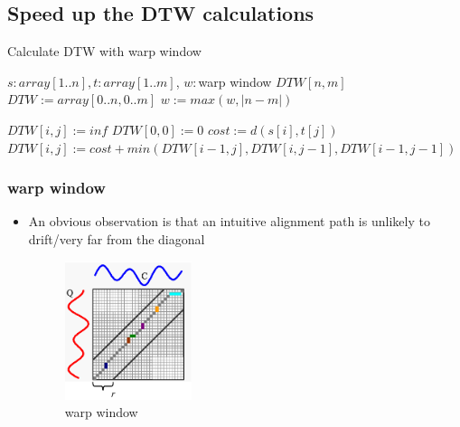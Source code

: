 \documentclass[xetex,mathserif,serif]{beamer}
\begin{document}
\subsection{Speed up the DTW calculations}

\begin{algorithm}
\caption{Calculate DTW with warp window}
\begin{algorithmic}[1]
\small
\REQUIRE $s:array[1..n], t:array[1..m]$, $w:$warp window
\ENSURE $DTW[n,m]$
\STATE $DTW := array[0..n,0..m]$
\STATE $w := max(w,\left| {n-m} \right|)$

\STATE $DTW[i,j] := inf$
\ENDFOR
\ENDFOR
\STATE $DTW[0,0] := 0$
\STATE
{}
\STATE $cost := d(s[i],t[j])$
\STATE $DTW[i,j]:=cost+min(DTW[i-1,j],DTW[i,j-1],DTW[i-1,j-1])$
\ENDFOR
\ENDFOR
\end{algorithmic}
\end{algorithm}

\begin{frame}
\frametitle{warp window}
\begin{itemize}
  \item An obvious observation is that an intuitive alignment path is unlikely to drift/very far from the diagonal
      \vspace{1em}
    \begin{figure}
      \centering
      \includegraphics[width=0.35\textwidth]{warp_window.png}
      \caption{warp window}\label{fig:4}
    \end{figure}
\end{itemize}
\end{frame}
\end{document}
